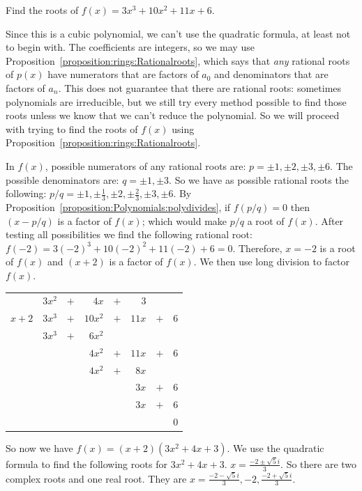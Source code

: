 \begin{example}{}
Find the roots of $f(x)=3x^3+10x^2+11x+6$.

Since this is a cubic polynomial, we can't use the quadratic formula, at least not to begin with. The coefficients are integers, so we may use Proposition~\ref{proposition:rings:Rationalroots}, which says that \emph{any} rational roots of $p(x)$ have numerators that are factors of $a_{0}$ and denominators that  are factors of $a_{n}$. This does not guarantee that there are rational roots: sometimes polynomials are irreducible, but we still try every method possible to find those roots unless we know that we can't reduce the polynomial. So we will proceed with trying to find the roots of $f(x)$ using Proposition~\ref{proposition:rings:Rationalroots}.

In $f(x)$, possible numerators of any rational roots are: $p=\pm1, \pm2, \pm3, \pm6$. The possible denominators are: $q=\pm1, \pm3$.
So we have as possible rational roots the following: $p/q= \pm1, \pm\frac{1}{3}, \pm2, \pm\frac{2}{3},\pm3, \pm6$.
By Proposition~\ref{proposition:Polynomials:polydivides}, if $f(p/q)=0$ then $(x-p/q)$ is a factor of $f(x)$; which would make $p/q$ a root of $f(x)$. After testing all possibilities we find the following rational root:
$f(-2)=3(-2)^3+10(-2)^2+11(-2)+6=0$. Therefore, $x=-2$ is a root of $f(x)$ and $(x+2)$ is a factor of $f(x)$.
We then use long division to factor $f(x)$.

\begin{center}
\begin{tabular}{rrcrcrcr}
        &  $3x^2$  &  $+$  &      $4x$  &  $+$  &    $3$  &       &       \\ \cline{2-8}
 \multicolumn{1}{r|}{$x + 2$}
        &  $3x^3$  &  $+$  &    $10x^2$  &  $+$  & $ 11x$  &  $+$  &  $6$  \\
        &  $3x^3$  &  $+$  &    $6 x^2$  &       &         &       &       \\ \cline{2-8}
        &         &       &                $4x^2$  & $+$  &  $ 11x$  &  $+$  &  $6$  \\
        &         &       &                $4x^2$  &  $+$  & $ 8x$  &       &       \\ \cline{4-8}
        &         &       &           &       &                         $3 x$  & $+$  & $6$  \\
        &         &       &           &       &                          $3x$  & $+$  & $6$  \\ \cline{6-8}
        &         &       &           &       &         &       &                               $0$
\end{tabular}
\end{center}
So now we have $f(x)=(x+2)(3x^2+4x+3)$. We use the quadratic formula to find the following roots for $3x^2+4x+3$.
$x=\frac{-2\pm \sqrt{5}i}{3}$.
So there are two complex roots and one real root. They are $x={\frac{-2 - \sqrt{5}i}{3}, -2, \frac{-2+ \sqrt{5}i}{3}}$.
\end{example}

